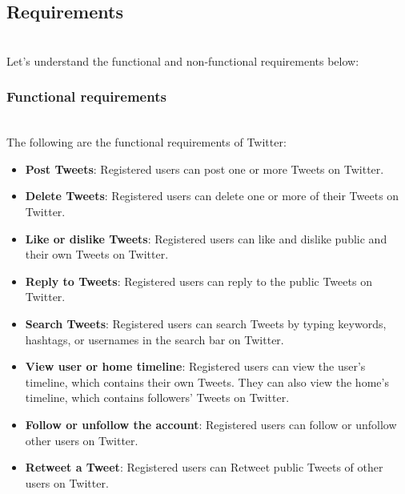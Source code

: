 

\subsection{Requirements}\label{t4kblnfka5B-Fc2pR0M1A}
\\
Let's understand the functional and non-functional requirements below:

\subsubsection{Functional requirements}\label{WrHxbEwDVUFx-FVkwWfHV}
\\
The following are the functional requirements of Twitter:

\begin{itemize}
\item
\protect{}\label{Kp3qCutjw1eVNDfDVLn3i}
\textbf{Post Tweets}: Registered users can post one or more Tweets on Twitter.
\item
\protect{}\label{rPN-7rBJ6Fyy-b-0XjmeF}
\textbf{Delete Tweets}: Registered users can delete one or more of their Tweets on Twitter.
\item
\protect{}\label{trkF6YR4ITDOBPuhJClfC}
\textbf{Like or dislike Tweets}: Registered users can like and dislike public and their own Tweets on Twitter.
\item
\protect{}\label{8izm0x2M5T6MmSqwWrbU-}
\textbf{Reply to Tweets}: Registered users can reply to the public Tweets on Twitter.
\item
\protect{}\label{_DWwQJNz23NskvICXo2qD}
\textbf{Search Tweets}: Registered users can search Tweets by typing keywords, hashtags, or usernames in the search bar on Twitter.
\item
\protect{}\label{f7h65JlxC9KoI3UUVjXpO}
\textbf{View user or home timeline}: Registered users can view the user's timeline, which contains their own Tweets. They can also view the home's timeline, which contains followers' Tweets on Twitter.
\item
\protect{}\label{xAsiDOkw7I50ZTGnxAMhB}
\textbf{Follow or unfollow the account}: Registered users can follow or unfollow other users on Twitter.
\item
\protect{}\label{Lbx2VmQEw_X2M6V_gL9TA}
\textbf{Retweet a Tweet}: Registered users can Retweet public Tweets of other users on Twitter.
\end{itemize}

